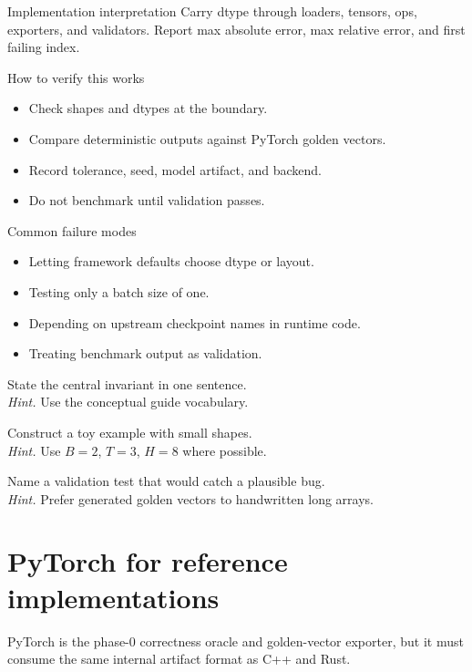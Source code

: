 \begin{implementationbox}{Implementation interpretation}
Carry dtype through loaders, tensors, ops, exporters, and validators. Report max absolute error, max relative error, and first failing index.
\end{implementationbox}

\begin{verificationbox}{How to verify this works}
\begin{itemize}
\item Check shapes and dtypes at the boundary.
\item Compare deterministic outputs against PyTorch golden vectors.
\item Record tolerance, seed, model artifact, and backend.
\item Do not benchmark until validation passes.
\end{itemize}
\end{verificationbox}

\begin{warningbox}{Common failure modes}
\begin{itemize}
\item Letting framework defaults choose dtype or layout.
\item Testing only a batch size of one.
\item Depending on upstream checkpoint names in runtime code.
\item Treating benchmark output as validation.
\end{itemize}
\end{warningbox}

\begin{chapterexercises}
\item State the central invariant in one sentence.\\
\textit{Hint.} Use the conceptual guide vocabulary.
\item Construct a toy example with small shapes.\\
\textit{Hint.} Use $B=2$, $T=3$, $H=8$ where possible.
\item Name a validation test that would catch a plausible bug.\\
\textit{Hint.} Prefer generated golden vectors to handwritten long arrays.
\end{chapterexercises}

\chapter{PyTorch for reference implementations}
\label{ch:pytorch}
PyTorch is the phase-0 correctness oracle and golden-vector exporter, but it must consume the same internal artifact format as C++ and Rust. \citep{pytorchDocs}



